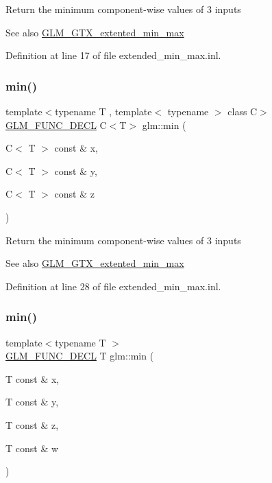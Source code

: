 Return the minimum component-\/wise values of 3 inputs \begin{DoxySeeAlso}{See also}
\mbox{\hyperlink{group__gtx__extented__min__max}{G\+L\+M\+\_\+\+G\+T\+X\+\_\+extented\+\_\+min\+\_\+max}} 
\end{DoxySeeAlso}


Definition at line 17 of file extended\+\_\+min\+\_\+max.\+inl.

\mbox{\label{group__gtx__extented__min__max_ga42b5c3fc027fd3d9a50d2ccc9126d9f0}} 
\subsubsection{\texorpdfstring{min()}{min()}\hspace{0.1cm}{\footnotesize\ttfamily [3/6]}}
{\footnotesize\ttfamily template$<$typename T , template$<$ typename $>$ class C$>$ \\
\mbox{\hyperlink{setup_8hpp_ab2d052de21a70539923e9bcbf6e83a51}{G\+L\+M\+\_\+\+F\+U\+N\+C\+\_\+\+D\+E\+CL}} C$<$T$>$ glm\+::min (\begin{DoxyParamCaption}\item[{C$<$ T $>$ const \&}]{x,  }\item[{C$<$ T $>$ const \&}]{y,  }\item[{C$<$ T $>$ const \&}]{z }\end{DoxyParamCaption})}

Return the minimum component-\/wise values of 3 inputs \begin{DoxySeeAlso}{See also}
\mbox{\hyperlink{group__gtx__extented__min__max}{G\+L\+M\+\_\+\+G\+T\+X\+\_\+extented\+\_\+min\+\_\+max}} 
\end{DoxySeeAlso}


Definition at line 28 of file extended\+\_\+min\+\_\+max.\+inl.

\mbox{\label{group__gtx__extented__min__max_ga95466987024d03039607f09e69813d69}} 
\subsubsection{\texorpdfstring{min()}{min()}\hspace{0.1cm}{\footnotesize\ttfamily [4/6]}}
{\footnotesize\ttfamily template$<$typename T $>$ \\
\mbox{\hyperlink{setup_8hpp_ab2d052de21a70539923e9bcbf6e83a51}{G\+L\+M\+\_\+\+F\+U\+N\+C\+\_\+\+D\+E\+CL}} T glm\+::min (\begin{DoxyParamCaption}\item[{T const \&}]{x,  }\item[{T const \&}]{y,  }\item[{T const \&}]{z,  }\item[{T const \&}]{w }\end{DoxyParamCaption})}

